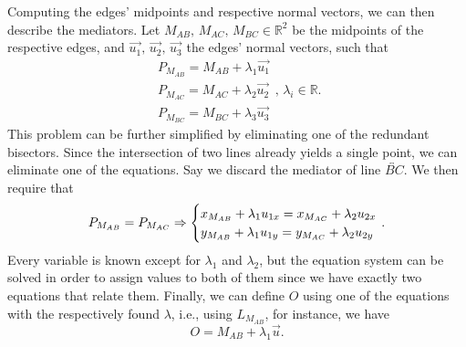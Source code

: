 \begin{comment}
This comes as a direct result from applying a rotation transformation of 90
degrees, or $\pi/2$ radians, to $\vec{u}$, like so
%
\[
  \vec{n} = R(\pi/2)\vec{u}%
  = \begin{bmatrix}
      \cos(\pi/2) & -\sin(\pi/2) \\
      \sin(\pi/2) & \cos(\pi/2)
    \end{bmatrix}
    \begin{bmatrix}
      u_1 \\ u_2
    \end{bmatrix}
  = \begin{bmatrix}
      0 & -1 \\
      1 & 0
    \end{bmatrix}
    \begin{bmatrix}
      u_1 \\ u_2
    \end{bmatrix}
  = \begin{bmatrix}
      -u_2 \\ u_1
    \end{bmatrix}.
\]
%
Let $\vec{u},\,\vec{n} \in \mathbb{R}^2$, such that $\vec{u} = (u_x,
u_y),\,\vec{n} = (-u_y, u_x)$.  From~\eqref{eq:vector.dot.2}, we have
\[ \vec{u} \cdot \vec{n} = u_x u_y - u_y u_x = 0.  \]
\end{comment}

Computing the edges' midpoints and respective normal vectors, we can then
describe the mediators.  Let $M_{AB},\,M_{AC},\,M_{BC} \in \mathbb{R}^2$ be the
midpoints of the respective edges, and $\vec{u_1},\,\vec{u_2},\,\vec{u_3}$ the
edges' normal vectors, such that
\[
  \begin{split}
    P_{M_{AB}} = M_{AB} + \lambda_1 \vec{u_1}\\
    P_{M_{AC}} = M_{AC} + \lambda_2 \vec{u_2}\\
    P_{M_{BC}} = M_{BC} + \lambda_3 \vec{u_3}
  \end{split}
  ,\,\lambda_i \in \mathbb{R}.
\]
This problem can be further simplified by eliminating one of the redundant
bisectors.  Since the intersection of two lines already yields a single point,
we can eliminate one of the equations.  Say we discard the mediator of line
$\overleftrightarrow{BC}$.  We then require that
\[
  P_{M_{AB}} = P_{M_{AC}} \Rightarrow \begin{cases}
    x_{M_{AB}} + \lambda_1 u_{1x} = x_{M_{AC}} + \lambda_2 u_{2x} \\
    y_{M_{AB}} + \lambda_1 u_{1y} = y_{M_{AC}} + \lambda_2 u_{2y}
  \end{cases}{\hskip -2ex}.
\]
Every variable is known except for $\lambda_1$ and $\lambda_2$, but the equation
system can be solved in order to assign values to both of them since we have
exactly two equations that relate them.  Finally, we can define $O$ using one of
the equations with the respectively found $\lambda$, i.e., using $L_{M_{AB}}$,
for instance, we have
\[
  O = M_{AB} + \lambda_1 \vec{u}.
\]

